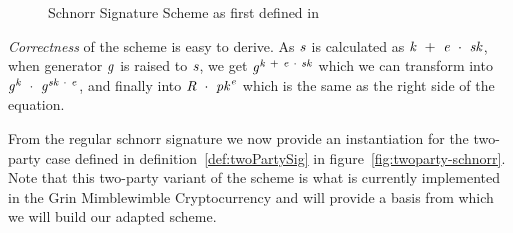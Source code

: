 \begin{figure}
    \begin{center}
        \fbox{
        \begin{varwidth}{\textwidth}
            \procedure[linenumbering]{$\procSetup{\varSecParam}$} {
            \varKey \sample \cnstIntegersPrimeWithoutZero{\varPrime} \\
            \pcreturn (\varSecKey \opAssign \varKey \opSeperate \varPubKey \opAssign \funGen{\varKey})
            }
            \procedure[linenumbering]{$\procSign{\varMsg}{\varSecKey}$}{
            \varNonce \sample \cnstIntegersPrimeWithoutZero{\varPrime} \\
            \varRand \opAssign \funGen{\varNonce} \\
            \varSchnorrChallenge \opAssign \funHash{\varMsg \opConc \varRand \opConc \varPubKey} \\
            \varS \opAssign \varNonce \opAddScalar \varSchnorrChallenge \opTimesScalar \varSecKey \\
            \pcreturn \varSignature \opAssign (\varS, \varRand)
            }
            \procedure[linenumbering]{$\procVerf{\varMsg}{\varSignature}{\varPubKey}$} {
            \varS \opAssign \opAccess{\varSignature}{\varS} \\
            \varRand \opAssign \opAccess{\varSignature}{\varRand} \\
            \varSchnorrChallenge \opAssign \funHash{\varMsg \opConc \varRand \opConc \varPubKey} \\
            \pcreturn \funGen{\varS} \opEq \opPointScalar{\varRand}{\varSchnorrChallenge} \opAddPoint \varPubKey
            }
        \end{varwidth}
        }
    \end{center}
    \caption{Schnorr Signature Scheme as first defined in~\cite{schnorr1989efficient}}
    \label{fig:schnorr}
\end{figure}
\textit{Correctness} of the scheme is easy to derive. As $\mathit{s}$ is calculated as $\mathit{k} ~+~ \mathit{e} ~\cdot~ \mathit{sk}$, when generator $\mathit{g}$ is raised to $\mathit{s}$, we get
$\mathit{g}^{\mathit{k} ~+~ \mathit{e} ~\cdot~ \mathit{sk}}$ which we can transform into $\mathit{g}^{\mathit{k}} ~\cdot~ \mathit{g}^{\mathit{sk} ~\cdot~ \mathit{e}}$, and finally
into $\mathit{R} ~\cdot~ \mathit{pk}^{\mathit{e}}$ which is the same as the right side of the equation.

From the regular schnorr signature we now provide an instantiation for the two-party case defined in definition~\ref{def:twoPartySig} in figure~\ref{fig:twoparty-schnorr}. Note that this two-party variant of the scheme is what is
currently implemented in the Grin Mimblewimble Cryptocurrency and will provide a basis from which we will build our adapted scheme.

